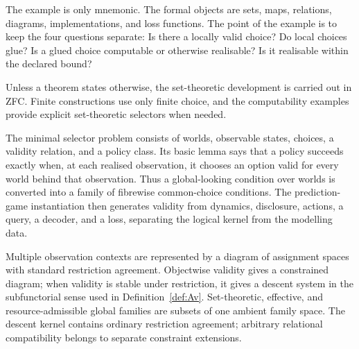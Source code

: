 \documentclass[11pt]{article}
\theoremstyle{plain}
\theoremstyle{definition}
\theoremstyle{remark}
\begin{document}
The example is only mnemonic. The formal objects are sets, maps, relations,
diagrams, implementations, and loss functions. The point of the example is to
keep the four questions separate: Is there a locally valid choice? Do local
choices glue? Is a glued choice computable or otherwise realisable? Is it
realisable within the declared bound?

Unless a theorem states otherwise, the set-theoretic development is carried out
in ZFC. Finite constructions use only finite choice, and the computability
examples provide explicit set-theoretic selectors when needed.

The minimal selector problem consists of worlds, observable states, choices, a
validity relation, and a policy class. Its basic lemma says that a policy
succeeds exactly when, at each realised observation, it chooses an option valid
for every world behind that observation. Thus a global-looking condition over
worlds is converted into a family of fibrewise common-choice conditions. The
prediction-game instantiation then generates validity from dynamics, disclosure,
actions, a query, a decoder, and a loss, separating the logical kernel from the
modelling data.

Multiple observation contexts are represented by a diagram of assignment spaces
with standard restriction agreement. Objectwise validity gives a constrained
diagram; when validity is stable under restriction, it gives a descent system in
the subfunctorial sense used in Definition~\ref{def:Av}. Set-theoretic,
effective, and resource-admissible global families are subsets of one ambient
family space. The descent kernel contains ordinary restriction agreement;
arbitrary relational compatibility belongs to separate constraint extensions.
\end{document}
